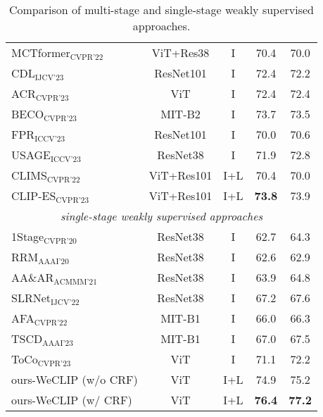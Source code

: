 \begin{table}[ht]
\begin{tabular}{l c c c c}
        MCTformer$_{\text{CVPR'22}}$~\cite{wsss_MCTformer} & ViT+Res38  & I    & 70.4          & 70.0          \\
        CDL$_{\text{IJCV'23}}$~\cite{wsss_cdl}        & ResNet101  & I    & 72.4          & 72.2          \\
        ACR$_{\text{CVPR'23}}$~\cite{wsss_acr}        & ViT        & I    & 72.4          & 72.4          \\
        BECO$_{\text{CVPR'23}}$~\cite{wsss_beco}      & MIT-B2     & I    & 73.7          & 73.5          \\
        FPR$_{\text{ICCV'23}}$~\cite{wsss_fpr}        & ResNet101  & I    & 70.0          & 70.6          \\
        USAGE$_{\text{ICCV'23}}$~\cite{wsss_usage}    & ResNet38   & I    & 71.9          & 72.8          \\
        CLIMS$_{\text{CVPR'22}}$~\cite{wsss_clims}    & ViT+Res101 & I+L  & 70.4          & 70.0          \\
        CLIP-ES$_{\text{CVPR'23}}$~\cite{wsss_clip_es}                       & ViT+Res101 & I+L  & \textbf{73.8} & 73.9          \\
        \hline
        \multicolumn{5}{c}{\textit{single-stage weakly supervised approaches}}                                                   \\
        1Stage$_{\text{CVPR'20}}$~\cite{wsss_single_stage}                   & ResNet38   & I    & 62.7          & 64.3          \\
        RRM$_{\text{AAAI'20}}$~\cite{wsss_reliability_does_matter}           & ResNet38   & I    & 62.6          & 62.9          \\
        AA\&AR$_{\text{ACMMM'21}}$~\cite{wsss_aaar}                                 & ResNet38   & I    & 63.9          & 64.8          \\
        SLRNet$_{\text{IJCV'22}}$~\cite{wsss_slr_net}                                  & ResNet38   & I    & 67.2          & 67.6          \\
        AFA$_{\text{CVPR'22}}$~\cite{wsss_afa_affinity_from_attention}                                     & MIT-B1     & I    & 66.0          & 66.3          \\
        TSCD$_{\text{AAAI'23}}$~\cite{wsss_tscd}                                    & MIT-B1     & I    & 67.0          & 67.5          \\
        ToCo$_{\text{CVPR'23}}$~\cite{wsss_toco_token_contrast}                                    & ViT        & I    & 71.1          & 72.2          \\
        \hline
        ours-WeCLIP (w/o CRF)                                                & ViT        & I+L  & 74.9          & 75.2          \\
        ours-WeCLIP (w/ CRF)                                                 & ViT        & I+L  & \textbf{76.4} & \textbf{77.2} \\
        \hline
    \end{tabular}
    \caption{Comparison of multi-stage and single-stage weakly supervised approaches.}
    \label{tab:quantitative_results}
\end{table}
